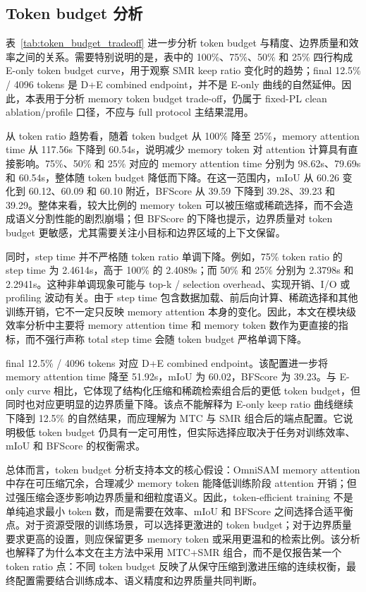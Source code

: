 \subsection{Token budget 分析}


表~\ref{tab:token_budget_tradeoff} 进一步分析 token budget 与精度、边界质量和效率之间的关系。需要特别说明的是，表中的 100\%、75\%、50\% 和 25\% 四行构成 E-only token budget curve，用于观察 SMR keep ratio 变化时的趋势；final 12.5\% / 4096 tokens 是 D+E combined endpoint，并不是 E-only 曲线的自然延伸。因此，本表用于分析 memory token budget trade-off，仍属于 fixed-PL clean ablation/profile 口径，不应与 full protocol 主结果混用。

从 token ratio 趋势看，随着 token budget 从 100\% 降至 25\%，memory attention time 从 117.56s 下降到 60.54s，说明减少 memory token 对 attention 计算具有直接影响。75\%、50\% 和 25\% 对应的 memory attention time 分别为 98.62s、79.69s 和 60.54s，整体随 token budget 降低而下降。在这一范围内，mIoU 从 60.26 变化到 60.12、60.09 和 60.10 附近，BFScore 从 39.59 下降到 39.28、39.23 和 39.29。整体来看，较大比例的 memory token 可以被压缩或稀疏选择，而不会造成语义分割性能的剧烈崩塌；但 BFScore 的下降也提示，边界质量对 token budget 更敏感，尤其需要关注小目标和边界区域的上下文保留。

同时，step time 并不严格随 token ratio 单调下降。例如，75\% token ratio 的 step time 为 2.4614s，高于 100\% 的 2.4089s；而 50\% 和 25\% 分别为 2.3798s 和 2.2941s。这种非单调现象可能与 top-k / selection overhead、实现开销、I/O 或 profiling 波动有关。由于 step time 包含数据加载、前后向计算、稀疏选择和其他训练开销，它不一定只反映 memory attention 本身的变化。因此，本文在模块级效率分析中主要将 memory attention time 和 memory token 数作为更直接的指标，而不强行声称 total step time 会随 token budget 严格单调下降。

final 12.5\% / 4096 tokens 对应 D+E combined endpoint。该配置进一步将 memory attention time 降至 51.92s，mIoU 为 60.02，BFScore 为 39.23。与 E-only curve 相比，它体现了结构化压缩和稀疏检索组合后的更低 token budget，但同时也对应更明显的边界质量下降。该点不能解释为 E-only keep ratio 曲线继续下降到 12.5\% 的自然结果，而应理解为 MTC 与 SMR 组合后的端点配置。它说明极低 token budget 仍具有一定可用性，但实际选择应取决于任务对训练效率、mIoU 和 BFScore 的权衡需求。

总体而言，token budget 分析支持本文的核心假设：OmniSAM memory attention 中存在可压缩冗余，合理减少 memory token 能降低训练阶段 attention 开销；但过强压缩会逐步影响边界质量和细粒度语义。因此，token-efficient training 不是单纯追求最小 token 数，而是需要在效率、mIoU 和 BFScore 之间选择合适平衡点。对于资源受限的训练场景，可以选择更激进的 token budget；对于边界质量要求更高的设置，则应保留更多 memory token 或采用更温和的检索比例。该分析也解释了为什么本文在主方法中采用 MTC+SMR 组合，而不是仅报告某一个 token ratio 点：不同 token budget 反映了从保守压缩到激进压缩的连续权衡，最终配置需要结合训练成本、语义精度和边界质量共同判断。


